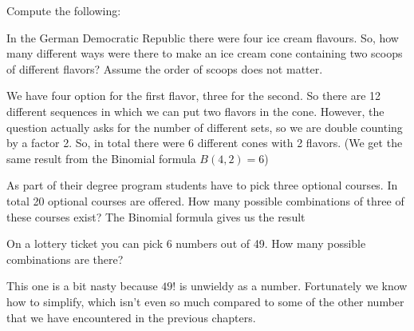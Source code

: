 

Compute the following: 

\subquestion 
In the German Democratic Republic there were four ice cream flavours. So, how many different ways were there to make an ice cream cone containing two scoops of different flavors? Assume the order of scoops does not matter.

\solution
We have four option for the first flavor, three for the second. So there are 12 different sequences in which we can put two flavors in the cone. However, the question actually asks for the number of different sets, so we are double counting by a factor 2. So, in total there were 6 different cones with 2 flavors. (We get the same result from the Binomial formula $B(4,2)=6$) 

\subquestion
As part of their degree program students have to pick three optional courses. In total 20 optional courses are offered. How many possible combinations of three of these courses exist?
\solution
The Binomial formula gives us the result 
 
\subquestion 
On a lottery ticket you can pick 6 numbers out of 49. How many possible combinations are there?

\solution
This one is a bit nasty because $49!$ is unwieldy as a number. Fortunately we know how to simplify,
which isn't even so much compared to some of the other number that we have encountered in the previous chapters. 

